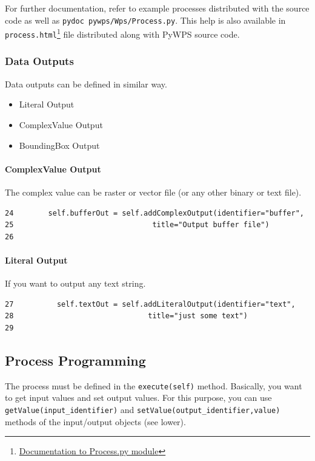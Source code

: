 \documentclass[a4paper,11pt]{article}
\begin{document}
For further documentation, refer to example processes distributed with the
source code as well as \texttt{pydoc~pywps/Wps/Process.py}. This help is
also available in
\texttt{process.html}\footnote{\href{http://wald.intevation.org/plugins/scmsvn/viewcvs.php/*checkout*/trunk/doc/process.html?rev=369&root=pywps}{Documentation
to Process.py module}} file distributed along with PyWPS
source code.

\subsubsection{Data Outputs}
Data outputs can be defined in similar way.
\begin{itemize}
    \item Literal Output
    \item ComplexValue Output
    \item BoundingBox Output
\end{itemize}
    
\paragraph{ComplexValue Output}
The complex value can be raster or vector file (or any other binary or text
file).

\begin{verbatim}
24        self.bufferOut = self.addComplexOutput(identifier="buffer",
25                                title="Output buffer file")
26
\end{verbatim}

\paragraph{Literal Output}
If you want to output any text string.
\begin{verbatim}
27          self.textOut = self.addLiteralOutput(identifier="text",
28                               title="just some text")
29
\end{verbatim}

\subsection{Process Programming}
    
The process must be defined in the \texttt{execute(self)} method. 
Basically, you want to get input values and set output values. For this
purpose, you can use \texttt{getValue(input\_identifier)} and
\texttt{setValue(output\_identifier,value)} methods of the input/output
objects (see lower).
\end{document}
